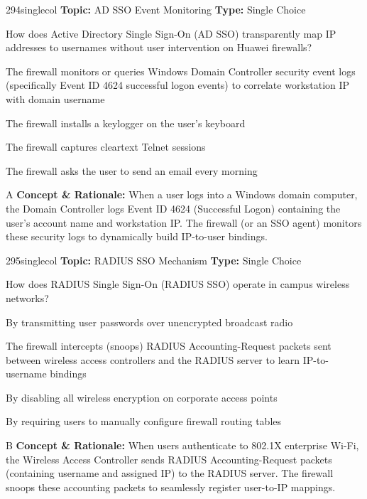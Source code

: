 \begin{qcard}{294}{singlecol}
\textcolor{darkslate!75}{\small\textbf{Topic:} AD SSO Event Monitoring \hfill \textbf{Type:} Single Choice}\vspace{0.4em}\par
How does Active Directory Single Sign-On (AD SSO) transparently map IP addresses to usernames without user intervention on Huawei firewalls?
\begin{qoptions}
\item The firewall monitors or queries Windows Domain Controller security event logs (specifically Event ID 4624 successful logon events) to correlate workstation IP with domain username
\item The firewall installs a keylogger on the user's keyboard
\item The firewall captures cleartext Telnet sessions
\item The firewall asks the user to send an email every morning
\end{qoptions}
\end{qcard}
\nopagebreak
\begin{explainbox}{A}
\textbf{Concept \& Rationale:} When a user logs into a Windows domain computer, the Domain Controller logs Event ID 4624 (Successful Logon) containing the user's account name and workstation IP. The firewall (or an SSO agent) monitors these security logs to dynamically build IP-to-user bindings.
\end{explainbox}

\begin{qcard}{295}{singlecol}
\textcolor{darkslate!75}{\small\textbf{Topic:} RADIUS SSO Mechanism \hfill \textbf{Type:} Single Choice}\vspace{0.4em}\par
How does RADIUS Single Sign-On (RADIUS SSO) operate in campus wireless networks?
\begin{qoptions}
\item By transmitting user passwords over unencrypted broadcast radio
\item The firewall intercepts (snoops) RADIUS Accounting-Request packets sent between wireless access controllers and the RADIUS server to learn IP-to-username bindings
\item By disabling all wireless encryption on corporate access points
\item By requiring users to manually configure firewall routing tables
\end{qoptions}
\end{qcard}
\nopagebreak
\begin{explainbox}{B}
\textbf{Concept \& Rationale:} When users authenticate to 802.1X enterprise Wi-Fi, the Wireless Access Controller sends RADIUS Accounting-Request packets (containing username and assigned IP) to the RADIUS server. The firewall snoops these accounting packets to seamlessly register user-to-IP mappings.
\end{explainbox}

